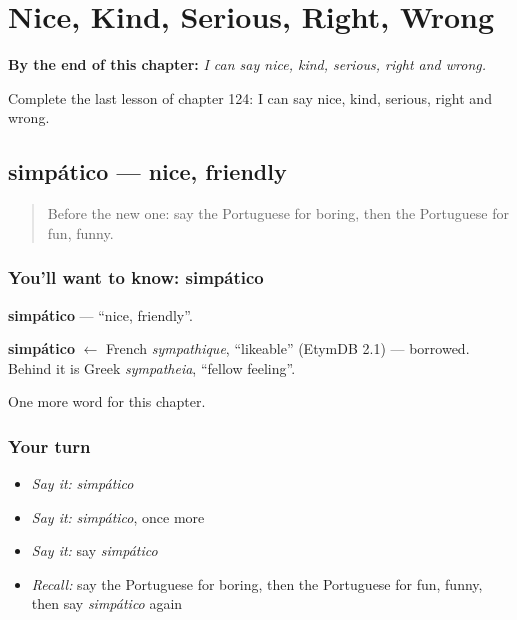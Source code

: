 
\chapter{Nice, Kind, Serious, Right, Wrong}
\label{ch:pt-nice-kind-serious-right-wrong}

\begin{chapteropening}
\textbf{By the end of this chapter:} \emph{I can say nice, kind, serious, right and wrong.}

Complete the last lesson of chapter 124: I can say nice, kind, serious, right and wrong.
\end{chapteropening}

\section[simpático]{simpático — nice, friendly}

\label{lesson:PT-C124-simpatico}



\begin{quote}
Before the new one: say the Portuguese for boring, then the Portuguese for fun, funny.
\end{quote}

\subsection*{You'll want to know: simpático}
\textbf{simpático} — \textquotedblleft{}nice, friendly\textquotedblright{}.

\begin{cousinweb}
\textbf{simpático} $\leftarrow$ French \emph{sympathique}, \textquotedblleft{}likeable\textquotedblright{} (EtymDB 2.1) — borrowed. Behind it is Greek \emph{sympatheia}, \textquotedblleft{}fellow feeling\textquotedblright{}.
\end{cousinweb}

\begin{grammarlens}[title={What you've built}]
One more word for this chapter.
\end{grammarlens}

\subsection*{Your turn}
\begin{itemize}
\raggedright
  \item \emph{Say it:} \emph{simpático}
  \item \emph{Say it:} \emph{simpático}, once more
  \item \emph{Say it:} say \emph{simpático}
  \item \emph{Recall:} say the Portuguese for boring, then the Portuguese for fun, funny, then say \emph{simpático} again
\end{itemize}

